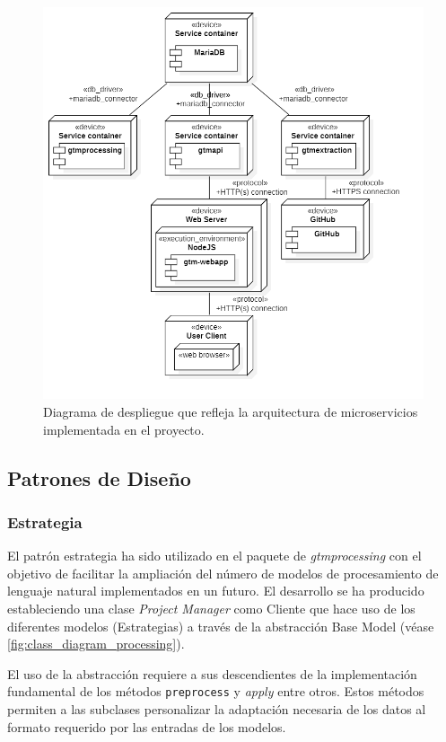 \begin{figure}[!ht]
	\centering
\includegraphics[width=\textwidth]{img/deployment_diagram.png}
	\caption{Diagrama de despliegue que refleja la arquitectura de microservicios implementada en el proyecto.}
	\label{fig:deployment_diagram}
\end{figure}

\subsection{Patrones de Diseño}

\subsubsection{Estrategia}

El patrón estrategia ha sido utilizado en el paquete de \textit{gtmprocessing} con el objetivo de facilitar la ampliación del número de modelos de procesamiento de lenguaje natural implementados en un futuro. El desarrollo se ha producido estableciendo una clase \textit{Project Manager} como Cliente que hace uso de los diferentes modelos (Estrategias) a través de la abstracción Base Model (véase \autoref{fig:class_diagram_processing}).

El uso de la abstracción requiere a sus descendientes de la implementación fundamental de los métodos \texttt{preprocess} y \textit{apply} entre otros. Estos métodos permiten a las subclases personalizar la adaptación necesaria de los datos al formato requerido por las entradas de los modelos. 

